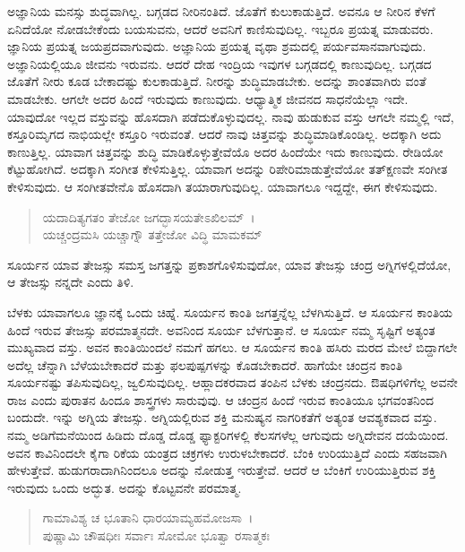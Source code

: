 ಅಜ್ಞಾನಿಯ ಮನಸ್ಸು ಶುದ್ಧವಾಗಿಲ್ಲ. ಬಗ್ಗಡದ ನೀರಿನಂತಿದೆ. ಜೊತೆಗೆ ಕುಲುಕಾಡುತ್ತಿದೆ. ಅವನೂ ಆ ನೀರಿನ ಕೆಳಗೆ ಏನಿದೆಯೋ ನೋಡಬೇಕೆಂದು ಬಯಸುವನು, ಆದರೆ ಅವನಿಗೆ ಕಾಣಿಸುವುದಿಲ್ಲ. ಇಬ್ಬರೂ ಪ್ರಯತ್ನ ಮಾಡುವರು. ಜ್ಞಾನಿಯ ಪ್ರಯತ್ನ ಜಯಪ್ರದವಾಗುವುದು. ಅಜ್ಞಾನಿಯ ಪ್ರಯತ್ನ ವೃಥಾ ಶ್ರಮದಲ್ಲಿ ಪರ್ಯವಸಾನವಾಗುವುದು. ಅಜ್ಞಾನಿಯಲ್ಲಿಯೂ ಜೀವನು ಇರುವನು. ಆದರೆ ದೇಹ ಇಂದ್ರಿಯ ಇವುಗಳ ಬಗ್ಗಡದಲ್ಲಿ ಕಾಣುವುದಿಲ್ಲ. ಬಗ್ಗಡದ ಜೊತೆಗೆ ನೀರು ಕೂಡ ಬೇಕಾದಷ್ಟು ಕುಲಕಾಡುತ್ತಿದೆ. ನೀರನ್ನು ಶುದ್ಧಿಮಾಡಬೇಕು. ಅದನ್ನು ಶಾಂತವಾಗಿರು ವಂತೆ ಮಾಡಬೇಕು. ಆಗಲೇ ಅದರ ಹಿಂದೆ ಇರುವುದು ಕಾಣುವುದು. ಆಧ್ಯಾತ್ಮಿಕ ಜೀವನದ ಸಾಧನೆಯೆಲ್ಲಾ ಇದೇ. ಯಾವುದೋ ಇಲ್ಲದ ವಸ್ತುವನ್ನು ಹೊಸದಾಗಿ ಪಡೆದುಕೊಳ್ಳುವುದಲ್ಲ. ನಾವು ಹುಡುಕುವ ವಸ್ತು ಆಗಲೇ ನಮ್ಮಲ್ಲಿ ಇದೆ, ಕಸ್ತೂರಿಮೃಗದ ನಾಭಿಯಲ್ಲೇ ಕಸ್ತೂರಿ ಇರುವಂತೆ. ಆದರೆ ನಾವು ಚಿತ್ತವನ್ನು ಶುದ್ಧಿಮಾಡಿಕೊಂಡಿಲ್ಲ. ಅದಕ್ಕಾಗಿ ಅದು ಕಾಣುತ್ತಿಲ್ಲ. ಯಾವಾಗ ಚಿತ್ತವನ್ನು ಶುದ್ಧಿ ಮಾಡಿಕೊಳ್ಳುತ್ತೇವೆಯೊ ಅದರ ಹಿಂದೆಯೇ ಇದು ಕಾಣುವುದು. ರೇಡಿಯೋ ಕೆಟ್ಟುಹೋಗಿದೆ. ಅದಕ್ಕಾಗಿ ಸಂಗೀತ ಕೇಳಿಸುತ್ತಿಲ್ಲ. ಯಾವಾಗ ಅದನ್ನು ರಿಪೇರಿಮಾಡುತ್ತೇವೆಯೋ ತತ್​ಕ್ಷಣವೇ ಸಂಗೀತ ಕೇಳಿಸುವುದು. ಆ ಸಂಗೀತವೇನೊ ಹೊಸದಾಗಿ ತಯಾರಾಗುವುದಿಲ್ಲ. ಯಾವಾಗಲೂ ಇದ್ದದ್ದೇ, ಈಗ ಕೇಳಿಸುವುದು.

\begin{verse}
ಯದಾದಿತ್ಯಗತಂ ತೇಜೋ ಜಗದ್ಭಾಸಯತೇಽಖಿಲಮ್~।\\ಯಚ್ಚಂದ್ರಮಸಿ ಯಚ್ಚಾಗ್ನೌ ತತ್ತೇಜೋ ವಿದ್ಧಿ ಮಾಮಕಮ್ 
\end{verse}

{\small ಸೂರ್ಯನ ಯಾವ ತೇಜಸ್ಸು ಸಮಸ್ತ ಜಗತ್ತನ್ನು ಪ್ರಕಾಶಗೊಳಿಸುವುದೋ, ಯಾವ ತೇಜಸ್ಸು ಚಂದ್ರ ಅಗ್ನಿಗಳಲ್ಲಿದೆಯೋ, ಆ ತೇಜಸ್ಸು ನನ್ನದೇ ಎಂದು ತಿಳಿ.}

ಬೆಳಕು ಯಾವಾಗಲೂ ಜ್ಞಾನಕ್ಕೆ ಒಂದು ಚಿಹ್ನೆ. ಸೂರ್ಯನ ಕಾಂತಿ ಜಗತ್ತನ್ನೆಲ್ಲ ಬೆಳಗಿಸುತ್ತಿದೆ. ಆ ಸೂರ್ಯನ ಕಾಂತಿಯ ಹಿಂದೆ ಇರುವ ತೇಜಸ್ಸು ಪರಮಾತ್ಮನದೇ. ಅವನಿಂದ ಸೂರ್ಯ ಬೆಳಗುತ್ತಾನೆ. ಆ ಸೂರ್ಯ ನಮ್ಮ ಸೃಷ್ಟಿಗೆ ಅತ್ಯಂತ ಮುಖ್ಯವಾದ ವಸ್ತು. ಅವನ ಕಾಂತಿಯಿಂದಲೆ ನಮಗೆ ಹಗಲು. ಆ ಸೂರ್ಯನ ಕಾಂತಿ ಹಸಿರು ಮರದ ಮೇಲೆ ಬಿದ್ದಾಗಲೇ ಅದೆಲ್ಲ ಚೆನ್ನಾಗಿ ಬೆಳೆಯಬೇಕಾದರೆ ಮತ್ತು ಫಲಪುಷ್ಪಗಳನ್ನು ಕೊಡಬೇಕಾದರೆ. ಹಾಗೆಯೇ ಚಂದ್ರನ ಕಾಂತಿ ಸೂರ್ಯನಷ್ಟು ತಪಿಸುವುದಿಲ್ಲ, ಜ್ವಲಿಸುವುದಿಲ್ಲ. ಆಹ್ಲಾದಕರವಾದ ತಂಪಿನ ಬೆಳಕು ಚಂದ್ರನದು. ಔಷಧಿಗಳಿಗೆಲ್ಲ ಅವನೇ ರಾಜ ಎಂದು ಪುರಾತನ ಹಿಂದೂ ಶಾಸ್ತ್ರಗಳು ಸಾರುವುವು. ಆ ಚಂದ್ರನ ಹಿಂದೆ ಇರುವ ಕಾಂತಿಯೂ ಭಗವಂತನಿಂದ ಬಂದುದೇ. ಇನ್ನು ಅಗ್ನಿಯ ತೇಜಸ್ಸು. ಅಗ್ನಿಯಲ್ಲಿರುವ ಶಕ್ತಿ ಮನುಷ್ಯನ ನಾಗರಿಕತೆಗೆ ಅತ್ಯಂತ ಆವಶ್ಯಕವಾದ ವಸ್ತು. ನಮ್ಮ ಅಡಿಗೆಮನೆಯಿಂದ ಹಿಡಿದು ದೊಡ್ಡ ದೊಡ್ಡ ಫ್ಯಾಕ್ಟರಿಗಳಲ್ಲಿ ಕೆಲಸಗಳೆಲ್ಲ ಆಗುವುದು ಅಗ್ನಿದೇವನ ದಯೆಯಿಂದ. ಅವನ ಕಾವಿನಿಂದಲೇ ಕೈಗಾ ರಿಕೆಯ ಯಂತ್ರದ ಚಕ್ರಗಳು ಉರುಳಬೇಕಾದರೆ. ಬೆಂಕಿ ಉರಿಯುತ್ತಿದೆ ಎಂದು ಸಹಜವಾಗಿ ಹೇಳುತ್ತೇವೆ. ಹುಡುಗರಾದಾಗಿನಿಂದಲೂ ಅದನ್ನು ನೋಡುತ್ತ ಇರುತ್ತೇವೆ. ಆದರೆ ಆ ಬೆಂಕಿಗೆ ಉರಿಯುತ್ತಿರುವ ಶಕ್ತಿ ಇರುವುದು ಒಂದು ಅದ್ಭುತ. ಅದನ್ನು ಕೊಟ್ಟವನೇ ಪರಮಾತ್ಮ.

\begin{verse}
ಗಾಮಾವಿಶ್ಯ ಚ ಭೂತಾನಿ ಧಾರಯಾಮ್ಯಹಮೋಜಸಾ~।\\ಪುಷ್ಣಾಮಿ ಚೌಷಧೀಃ ಸರ್ವಾಃ ಸೋಮೋ ಭೂತ್ವಾ ರಸಾತ್ಮಕಃ 
\end{verse}

